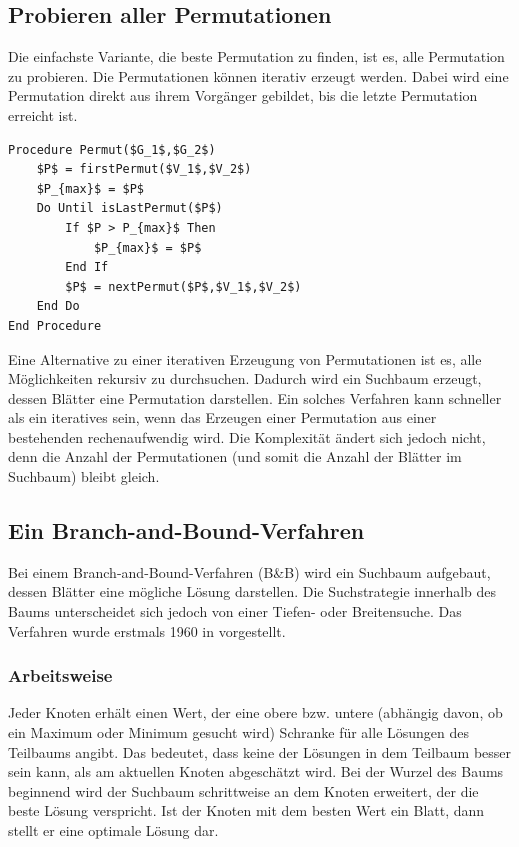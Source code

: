\subsection{Probieren aller Permutationen}
Die einfachste Variante, die beste Permutation zu finden, ist es, alle Permutation 
zu probieren. Die Permutationen können iterativ erzeugt werden. Dabei wird eine 
Permutation direkt aus ihrem Vorgänger gebildet, bis die letzte Permutation erreicht 
ist.

\begin{lstlisting}[float=h, caption={Probieren aller Permutationen},label={lst:Permut}]
Procedure Permut($G_1$,$G_2$)
    $P$ = firstPermut($V_1$,$V_2$)
    $P_{max}$ = $P$
    Do Until isLastPermut($P$)
        If $P > P_{max}$ Then
            $P_{max}$ = $P$
        End If
        $P$ = nextPermut($P$,$V_1$,$V_2$)
    End Do
End Procedure
\end{lstlisting}

Eine Alternative zu einer iterativen Erzeugung von Permutationen ist es, alle 
Möglichkeiten rekursiv zu durchsuchen. Dadurch wird ein Suchbaum erzeugt, dessen 
Blätter eine Permutation darstellen. Ein solches Verfahren kann schneller als 
ein iteratives sein, wenn das Erzeugen einer Permutation aus einer bestehenden 
rechenaufwendig wird. Die Komplexität ändert sich jedoch nicht, denn die 
Anzahl der Permutationen (und somit die Anzahl der Blätter im Suchbaum) bleibt gleich. 

\subsection{Ein Branch-and-Bound-Verfahren}\label{BBAlgo}
Bei einem Branch-and-Bound-Verfahren (B\&B) wird ein Suchbaum aufgebaut, dessen 
Blätter eine mögliche Lösung darstellen. Die Suchstrategie innerhalb des Baums 
unterscheidet sich jedoch von einer Tiefen- oder Breitensuche. Das Verfahren wurde 
erstmals 1960 in \cite{BBOrginal} vorgestellt.

\subsubsection{Arbeitsweise}
Jeder Knoten erhält einen Wert, der eine obere bzw. untere (abhängig davon, ob ein 
Maximum oder Minimum gesucht wird) Schranke für alle Lösungen des Teilbaums angibt. 
Das bedeutet, dass keine der Lösungen in dem Teilbaum besser sein kann, als am 
aktuellen Knoten abgeschätzt wird. 
Bei der Wurzel des Baums beginnend wird der Suchbaum schrittweise an dem Knoten 
erweitert, der die beste Lösung verspricht. Ist der Knoten mit dem besten Wert ein 
Blatt, dann stellt er eine optimale Lösung dar. 

